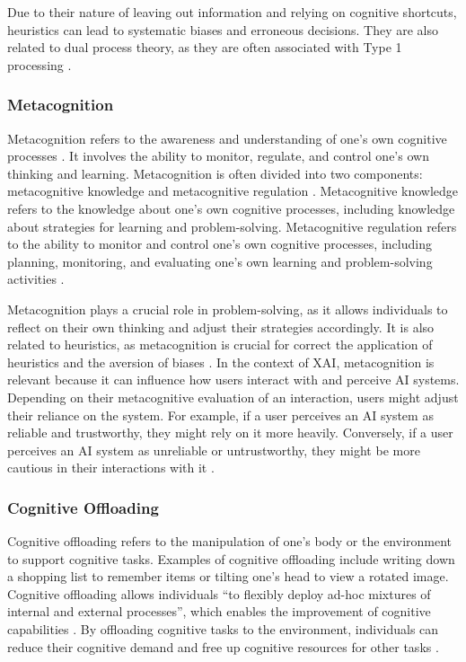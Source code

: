 Due to their nature of leaving out information and relying on cognitive shortcuts, heuristics can lead to systematic biases and erroneous decisions. They are also related to dual process theory, as they are often associated with Type 1 processing \parencite{Evans2013}.

\subsubsection{Metacognition} \label{sssec:metacognition}

Metacognition refers to the awareness and understanding of one's own cognitive processes \parencite{Flavell1979}. It involves the ability to monitor, regulate, and control one's own thinking and learning. Metacognition is often divided into two components: metacognitive knowledge and metacognitive regulation \parencite{Schraw2006}. Metacognitive knowledge refers to the knowledge about one's own cognitive processes, including knowledge about strategies for learning and problem-solving. Metacognitive regulation refers to the ability to monitor and control one's own cognitive processes, including planning, monitoring, and evaluating one's own learning and problem-solving activities \parencite{Cross1988}.

Metacognition plays a crucial role in problem-solving, as it allows individuals to reflect on their own thinking and adjust their strategies accordingly. It is also related to heuristics, as metacognition is crucial for correct the application of heuristics and the aversion of biases \parencite{Koriat2010}. In the context of \ac{XAI}, metacognition is relevant because it can influence how users interact with and perceive AI systems. Depending on their metacognitive evaluation of an interaction, users might adjust their reliance on the system. For example, if a user perceives an AI system as reliable and trustworthy, they might rely on it more heavily. Conversely, if a user perceives an AI system as unreliable or untrustworthy, they might be more cautious in their interactions with it \parencite{Jussupow2021, Shin2021}.

\subsubsection{Cognitive Offloading} \label{sssec:cognitive_offloading}

Cognitive offloading refers to the manipulation of one's body or the environment to support cognitive tasks. Examples of cognitive offloading include writing down a shopping list to remember items or tilting one's head to view a rotated image. Cognitive offloading allows individuals “to flexibly deploy ad-hoc mixtures of internal and external processes”, which enables the improvement of cognitive capabilities \parencite{Risko2016}. By offloading cognitive tasks to the environment, individuals can reduce their cognitive demand and free up cognitive resources for other tasks \parencite{Risko2016}.

